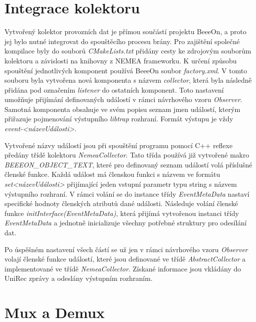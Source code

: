 
\section{Integrace kolektoru}    
     Vytvořený kolektor provozních dat je přímou součástí projektu BeeeOn, a proto jej bylo nutné 
     integrovat do spouštěcího procesu brány. Pro zajištění společné kompilace byly do souborů 
     \textit{CMakeLists.txt} přidány cesty ke zdrojovým souborům kolektoru a závislosti na knihovny
     z NEMEA frameworku. K určení způsobu spouštění jednotlivých komponent používá BeeeOn
     soubor \textit{factory.xml}. V tomto souboru byla vytvořena nová komponenta s názvem 
     \textit{collector}, 
     která byla následně přidána pod označením \textit{listener} do ostatních komponent. Toto nastavení 
     umožňuje přijímání definovaných událostí v rámci návrhového vzoru \textit{Observer}.
     Samotná komponenta
     obsahuje ve svém popisu seznam jmen událostí, kterým přiřazuje pojmenování výstupního \textit{libtrap}
     rozhraní. Formát výstupu je vždy \textit{event-<názevUdálosti>}. 
     
     Vytvořené názvy událostí jsou při spouštění programu pomocí C++ reflexe předány třídě kolektoru
     \textit{NemeaCollector}. Tato třída používá již vytvořené makro \textit{BEEEON\_OBJECT\_TEXT},
     které pro definovaný seznam 
     událostí volá příslušné členské funkce. Každá událost má členskou funkci s názvem ve formátu 
     \textit{set<názevUdálosti>} přijímající jeden vstupní parametr typu string s názvem výstupního 
     rozhraní. V rámci volání se do instance třídy \textit{EventMetaData}
     nastaví specifické hodnoty členských
     atributů dané události. Následuje volání členské funkce \textit{initInterface(EventMetaData)},
     která přijímá vytvořenou instanci třídy  \textit{EventMetaData} a
     jednotně inicializuje všechny potřebné struktury pro odesílání dat.
     
     Po úspěšném nastavení všech částí se už jen v rámci návrhového vzoru \textit{Observer} volají
     členské funkce událostí, které jsou definované ve třídě \textit{AbstractCollector} a implementované
     ve třídě \textit{NemeaCollector}. Získané informace jsou vkládány do UniRec zprávy a odeslány
     výstupním rozhraním.
     
\section{Mux a Demux}    

